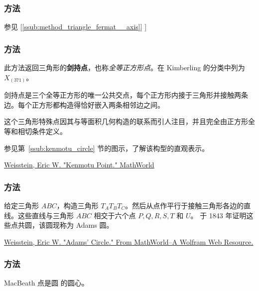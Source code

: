 \subsubsection{方法 }
\label{ssub:method_triangle_second__fermat__point}
参见 [\ref{ssub:method_triangle_fermat__axis}]
]

\subsubsection{方法 }
\label{ssub:_triangle_kenmotu__point}

此方法返回三角形的\textbf{剑持点}，也称\emph{全等正方形点}。在 Kimberling 的分类中列为 $X_{(371)}$。

\medskip

剑持点是三个全等正方形的唯一公共交点，每个正方形内接于三角形并接触两条边。每个正方形都构造得恰好嵌入两条相邻边之间。

\medskip

这个三角形特殊点因其与等面积几何构造的联系而引人注目，并且完全由正方形全等和相切条件定义。

\medskip

参见第~\ref{ssub:kenmotu_circle} 节的图示，了解该构型的直观表示。
\begin{flushright}
\small
\href{[URL1]}{Weisstein, Eric W. "Kenmotu Point." MathWorld}
\end{flushright}

\subsubsection{方法 }
\label{ssub:method_triangle_adams_points}
给定三角形 $ABC$，构造三角形 $T_AT_BT_C$。然后从点作平行于接触三角形各边的直线。这些直线与三角形 $ABC$ 相交于六个点 $P, Q, R, S, T$ 和 $U$。 于 1843 年证明这些点共圆，该圆现称为 Adams 圆。
\begin{flushright}
\small
\href{[URL1]}{Weisstein, Eric W. "Adams' Circle." From MathWorld--A Wolfram Web Resource.}
\end{flushright}

\subsubsection{方法 }
\label{ssub:method_triangle_macbeath_point}
MacBeath 点是圆  的圆心。

